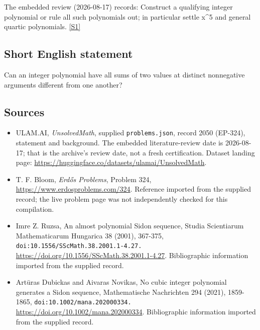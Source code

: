 \documentclass[11pt,a4paper]{article}
\newcommand{\sref}[2]{\hyperlink{source:#1:#2}{[S#2]}}
\begin{document}
The embedded review (2026-08-17) records: Construct a qualifying integer polynomial or rule all such polynomials out; in particular settle x\textasciicircum{}5 and general quartic polynomials. \sref{2050}{1}

\subsection{Short English statement}

Can an integer polynomial have all sums of two values at distinct nonnegative arguments different from one another?

\subsection{Sources}

{\small

\begin{itemize}

\item[\hypertarget{source:2050:1}{S1}] ULAM.AI, \emph{UnsolvedMath}, supplied \texttt{problems.json}, record 2050 (EP-324), statement and background. The embedded literature-review date is 2026-08-17; that is the archive’s review date, not a fresh certification. Dataset landing page: \url{https://huggingface.co/datasets/ulamai/UnsolvedMath}.

\item[\hypertarget{source:2050:2}{S2}] T. F. Bloom, \emph{Erdős Problems}, Problem 324, \url{https://www.erdosproblems.com/324}. Reference imported from the supplied record; the live problem page was not independently checked for this compilation.

\item[\hypertarget{source:2050:3}{S3}] Imre Z. Ruzsa, An almost polynomial Sidon sequence, Studia Scientiarum Mathematicarum Hungarica 38 (2001), 367-375, \nolinkurl{doi:10.1556/SScMath.38.2001.1-4.27.} \url{https://doi.org/10.1556/SScMath.38.2001.1-4.27}. Bibliographic information imported from the supplied record.

\item[\hypertarget{source:2050:4}{S4}] Artūras Dubickas and Aivaras Novikas, No cubic integer polynomial generates a Sidon sequence, Mathematische Nachrichten 294 (2021), 1859-1865, \nolinkurl{doi:10.1002/mana.202000334.} \url{https://doi.org/10.1002/mana.202000334}. Bibliographic information imported from the supplied record.

\end{itemize}

}

\label{end:2050}
\end{document}
